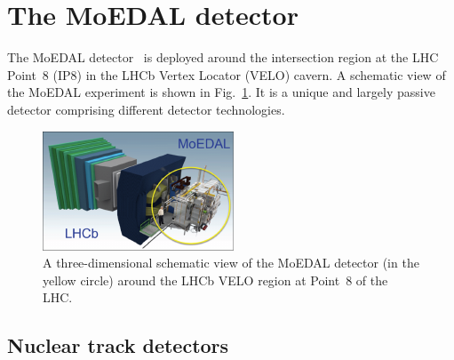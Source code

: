 \section{The MoEDAL detector}\label{sc:detector}

The MoEDAL detector~\cite{moedal} is deployed around the intersection region at the LHC Point~8 (IP8) in the LHCb Vertex Locator (VELO) cavern. A schematic view of the MoEDAL experiment is shown in Fig.~\ref{fg:moedal-lhcb}. It is a unique and largely passive detector comprising different detector technologies. 
\begin{figure}[htb]
\begin{minipage}[b]{0.55\textwidth}
\includegraphics[width=\textwidth]{plots/moedal-detector}
\end{minipage}\hspace{0.05\textwidth}%
\begin{minipage}[b]{0.4\textwidth}
\caption{\label{fg:moedal-lhcb} A three-dimensional schematic view of the MoEDAL detector (in the yellow circle) around the LHCb VELO region at Point~8 of the LHC.}
\end{minipage} 
\end{figure}

\subsection{Nuclear track detectors}\label{sc:ndt}

